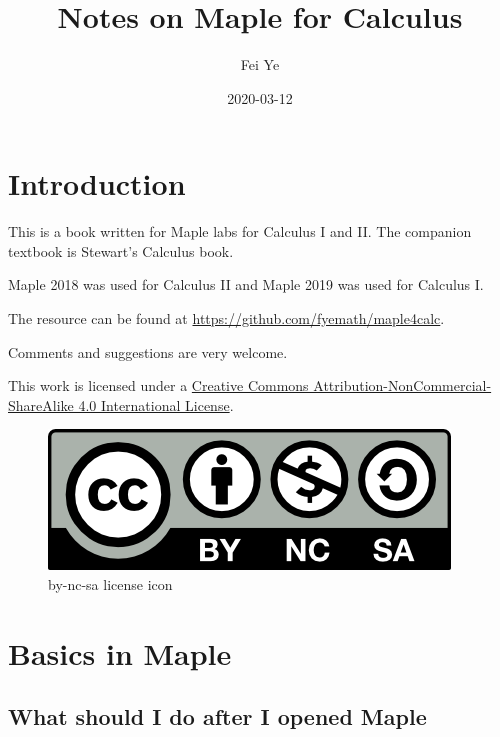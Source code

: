 \documentclass[en,11pt,simple]{elegantbook}
\title{Notes on Maple for Calculus}
\author{Fei Ye}
\date{2020-03-12}
\renewcommand{\baselinestretch}{1.2}
\renewcommand{\baselinestretch}{0.975}
\begin{document}
\maketitle

{
\setcounter{tocdepth}{0}
\tableofcontents
}
\mainmatter

\hypersetup{pageanchor=true}

\renewcommand{\baselinestretch}{1.2}\normalsize

\captionsetup[figure]{labelformat=empty}
\captionsetup[subfigure]{labelformat=empty}

\hypertarget{introduction}{%
\chapter*{Introduction}\label{introduction}}

This is a book written for Maple labs for Calculus I and II. The companion textbook is Stewart's Calculus book.

Maple 2018 was used for Calculus II and Maple 2019 was used for Calculus I.

The resource can be found at \url{https://github.com/fyemath/maple4calc}.

Comments and suggestions are very welcome.

This work is licensed under a \href{https://creativecommons.org/licenses/by-nc-sa/4.0/}{Creative Commons Attribution-NonCommercial-ShareAlike 4.0 International License}.

\begin{figure}
\centering
\includegraphics{figs/by-nc-sa.png}
\caption{by-nc-sa license icon}
\end{figure}

\hypertarget{basics-in-maple}{%
\chapter{Basics in Maple}\label{basics-in-maple}}

\hypertarget{what-should-i-do-after-i-opened-maple}{%
\section{What should I do after I opened Maple}\label{what-should-i-do-after-i-opened-maple}}
\end{document}
